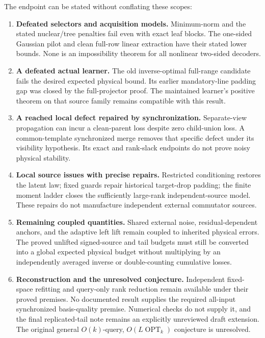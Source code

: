 \documentclass[11pt,oneside,openany,a4paper]{book}
\numberwithin{equation}{chapter}
\theoremstyle{definition}
\theoremstyle{remark}
\begin{document}
The endpoint can be stated without conflating these scopes:
\begin{enumerate}[leftmargin=*,label=\arabic*.]
 \item \textbf{Defeated selectors and acquisition models.}
 Minimum-norm and the stated nuclear/tree penalties fail even with
 exact leaf blocks.  The one-sided Gaussian pilot and clean full-row
 linear extraction have their stated lower bounds.  None is an
 impossibility theorem for all nonlinear two-sided decoders.
 \item \textbf{A defeated actual learner.}
 The old inverse-optimal full-range candidate fails the desired
 expected physical bound.  Its earlier mandatory-line padding gap was
 closed by the full-projector proof.  The maintained learner's positive
 theorem on that source family remains compatible with this result.
 \item \textbf{A reached local defect repaired by synchronization.}
 Separate-view propagation can incur a clean-parent loss despite zero
 child-union loss.  A common-template synchronized merge removes that
 specific defect under its visibility hypothesis.  Its exact and
 rank-slack endpoints do not prove noisy physical stability.
 \item \textbf{Local source issues with precise repairs.}
 Restricted conditioning restores the latent law; fixed guards repair
 historical target-drop padding; the finite moment ladder closes the
 sufficiently large-rank independent-source model.  These repairs do
 not manufacture independent external commutator sources.
 \item \textbf{Remaining coupled quantities.}
 Shared external noise, residual-dependent anchors, and the adaptive
 left lift remain coupled to inherited physical errors.  The proved
 unlifted signed-source and tail budgets must still be converted into
 a global expected physical budget without multiplying by an
 independently averaged inverse or double-counting cumulative losses.
 \item \textbf{Reconstruction and the unresolved conjecture.}
 Independent fixed-space refitting and query-only rank reduction remain
 available under their proved premises.  No documented result supplies
 the required all-input synchronized basis-quality premise.  Numerical
 checks do not supply it, and the final replicated-tail note remains
 an explicitly unreviewed draft extension.  The original general
 $O(k)$-query, $O(L\operatorname{OPT}_k)$ conjecture is unresolved.
\end{enumerate}
\end{document}
